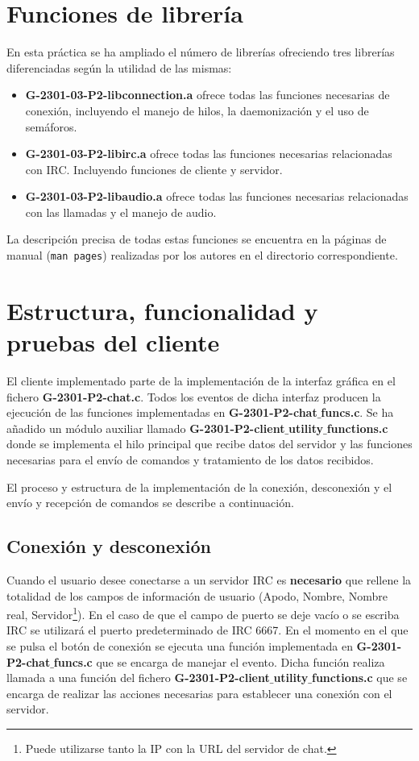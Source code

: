 \documentclass{mathnotes}
\begin{document}
\section{Funciones de librería}
En esta práctica se ha ampliado el número de librerías ofreciendo tres librerías diferenciadas según la utilidad de las mismas:

\begin{itemize}
\item \textbf{G-2301-03-P2-libconnection.a} ofrece todas las funciones necesarias de conexión, incluyendo el manejo de hilos, la daemonización y el uso de semáforos.

\item \textbf{G-2301-03-P2-libirc.a} ofrece todas las funciones necesarias relacionadas con IRC. Incluyendo funciones de cliente y servidor.

\item \textbf{G-2301-03-P2-libaudio.a} ofrece todas las funciones necesarias relacionadas con las llamadas y el manejo de audio.
\end{itemize}

La descripción precisa de todas estas funciones se encuentra en la páginas de manual (\texttt{man pages}) realizadas por los autores en el directorio correspondiente.

\section{Estructura, funcionalidad y pruebas del cliente}

El cliente implementado parte de la implementación de la interfaz gráfica en el fichero \textbf{G-2301-P2-chat.c}. Todos los eventos de dicha interfaz producen la ejecución de las funciones implementadas en \textbf{G-2301-P2-chat$\_$funcs.c}. Se ha añadido un módulo auxiliar llamado \textbf{G-2301-P2-client$\_$utility$\_$functions.c} donde se implementa el hilo principal que recibe datos del servidor y las funciones necesarias para el envío de comandos y tratamiento de los datos recibidos.

El proceso y estructura de la implementación de la conexión, desconexión y el envío y recepción de comandos se describe a continuación.

\subsection{Conexión y desconexión}
Cuando el usuario desee conectarse a un servidor IRC es \textbf{necesario} que rellene la totalidad de los campos de información de usuario (Apodo, Nombre, Nombre real, Servidor\footnote{Puede utilizarse tanto la IP con la URL del servidor de chat.}). En el caso de que el campo de puerto se deje vacío o se escriba IRC se utilizará el puerto predeterminado de IRC 6667. En el momento en el que se pulsa el botón de conexión se ejecuta una función implementada en \textbf{G-2301-P2-chat$\_$funcs.c} que se encarga de manejar el evento. Dicha función realiza llamada a una función del fichero \textbf{G-2301-P2-client$\_$utility$\_$functions.c} que se encarga de realizar las acciones necesarias para establecer una conexión con el servidor.
\end{document}

